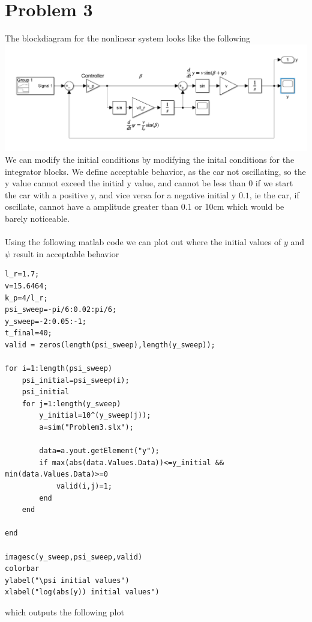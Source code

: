 \documentclass[12pt]{article}
\begin{document}
\section*{Problem 3}
The blockdiagram for the nonlinear system looks like the following\\
\includegraphics[scale=0.4]{Problem3BlockDiagram.PNG}\\
We can modify the initial conditions by modifying the inital conditions for the integrator blocks. We define acceptable behavior, 
as the car not oscillating, so the y value cannot exceed the initial y value, and cannot be less than 0 if we start the car with a positive y,
and vice versa for a negative initial y
$0.1$, ie the car, if oscillate, cannot have a amplitude greater than 0.1 or 10cm which would be barely noticeable.
\\\\
Using the following matlab code we can plot out where the initial values of $y$ and $\psi$ result in acceptable behavior
\begin{verbatim}
l_r=1.7;
v=15.6464;
k_p=4/l_r;
psi_sweep=-pi/6:0.02:pi/6;
y_sweep=-2:0.05:-1;
t_final=40;
valid = zeros(length(psi_sweep),length(y_sweep));

for i=1:length(psi_sweep)
    psi_initial=psi_sweep(i);
    psi_initial
    for j=1:length(y_sweep)
        y_initial=10^(y_sweep(j));
        a=sim("Problem3.slx");

        data=a.yout.getElement("y");
        if max(abs(data.Values.Data))<=y_initial && min(data.Values.Data)>=0
            valid(i,j)=1;
        end
    end

end

imagesc(y_sweep,psi_sweep,valid)
colorbar
ylabel("\psi initial values")
xlabel("log(abs(y)) initial values")
\end{verbatim}
which outputs the following plot\\
\end{document}

